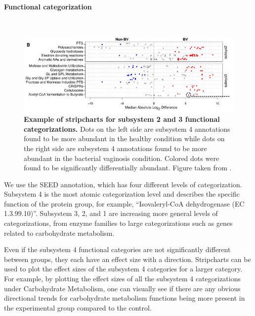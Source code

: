 \paragraph{Functional categorization}\mbox{}\\

\begin{figure}[h]
\begin{center}
\includegraphics[width=\textwidth]{stripchart.png}
\caption[Example of stripcharts for subsystem 2 and 3 functional categorizations.]{\textbf{Example of stripcharts for subsystem 2 and 3 functional categorizations.} Dots on the left side are subsystem 4 annotations found to be more abundant in the healthy condition while dots on the right side are subsystem 4 annotations found to be more abundant in the bacterial vaginosis condition. Colored dots were found to be significantly differentially abundant. Figure taken from \cite{macklaim2013comparative}.}
\end{center}
\end{figure}

We use the SEED annotation, which has four different levels of categorization. Subsystem 4 is the most atomic categorization level and describes the specific function of the protein group, for example, “Isovaleryl-CoA dehydrogenase (EC 1.3.99.10)”. Subsystem 3, 2, and 1 are increasing more general levels of categorizations, from enzyme families to large categorizations such as genes related to carbohydrate metabolism.

Even if the subsystem 4 functional categories are not significantly different between groups, they each have an effect size with a direction. Stripcharts can be used to plot the effect sizes of the subsystem 4 categories for a larger category. For example, by plotting the effect sizes of all the subsystem 4 categorizations under Carbohydrate Metabolism, one can visually see if there are any obvious directional trends for carbohydrate metabolism functions being more present in the experimental group compared to the control.

